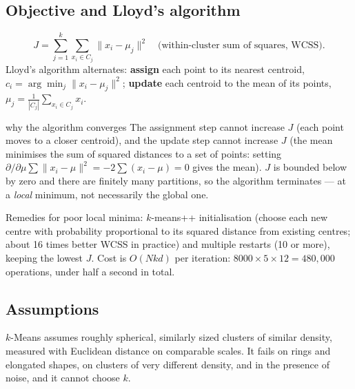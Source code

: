 \documentclass[11pt]{article}
\begin{document}
\subsection{Objective and Lloyd's algorithm}
\[J=\sum_{j=1}^k\sum_{x_i\in C_j}\|x_i-\mu_j\|^2\quad\text{(within-cluster sum of squares, WCSS).}\]
Lloyd's algorithm alternates: \textbf{assign} each point to its nearest centroid, $c_i=\arg\min_j\|x_i-\mu_j\|^2$; \textbf{update} each centroid to the mean of its points, $\mu_j=\frac1{|C_j|}\sum_{x_i\in C_j}x_i$.
\begin{derivation}{why the algorithm converges}
The assignment step cannot increase $J$ (each point moves to a closer centroid), and the update step cannot increase $J$ (the mean minimises the sum of squared distances to a set of points: setting $\partial/\partial\mu\sum\|x_i-\mu\|^2=-2\sum(x_i-\mu)=0$ gives the mean). $J$ is bounded below by zero and there are finitely many partitions, so the algorithm terminates --- at a \emph{local} minimum, not necessarily the global one.
\end{derivation}
Remedies for poor local minima: $k$-means++ initialisation (choose each new centre with probability proportional to its squared distance from existing centres; about 16 times better WCSS in practice) and multiple restarts (10 or more), keeping the lowest $J$. Cost is $O(Nkd)$ per iteration: $8000\times5\times12=480{,}000$ operations, under half a second in total.

\subsection{Assumptions}
$k$-Means assumes roughly spherical, similarly sized clusters of similar density, measured with Euclidean distance on comparable scales. It fails on rings and elongated shapes, on clusters of very different density, and in the presence of noise, and it cannot choose $k$.
\end{document}
